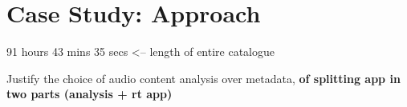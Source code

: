 \chapter{Case Study: Approach} %

\label{Chapter4} %


91 hours 43 mins 35 secs  <-- length of entire catalogue

Justify the choice of audio content analysis over metadata, \textbf{of splitting app in two parts (analysis + rt app)}